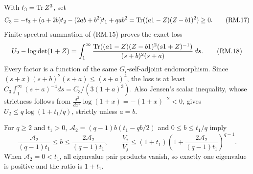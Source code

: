 With $t_3=\operatorname{Tr} Z^3$, set
\begin{equation}
 C_3=-t_3+(a+2b)t_2-(2ab+b^2)t_1+qab^2
 =\operatorname{Tr}((a1-Z)(Z-b1)^2)\ge0.\tag{RM.17}
\end{equation}
Finite spectral summation of (RM.15) proves the exact loss
\begin{equation}
 U_2-\log\det(1+Z)=\int_1^\infty
 \frac{\operatorname{Tr}((a1-Z)(Z-b1)^2(s1+Z)^{-1})}{(s+b)^2(s+a)}\,ds.
 \tag{RM.18}
\end{equation}
Every factor is a function of the same $G_i$-self-adjoint endomorphism.
Since $(s+x)(s+b)^2(s+a)\le(s+a)^4$, the loss is at least
$C_3\int_1^\infty(s+a)^{-4}ds=C_3/(3(1+a)^3)$.
Also Jensen's scalar inequality, whose strictness follows from
$\frac{d^2}{dx^2}\log(1+x)=-(1+x)^{-2}<0$, gives
$U_2\le q\log(1+t_1/q)$, strictly unless $a=b$.

For $q\ge2$ and $t_1>0$,
$\mathcal A_2=(q-1)b(t_1-qb/2)$ and $0\le b\le t_1/q$ imply
\begin{equation}
 \frac{\mathcal A_2}{(q-1)t_1}\le b
 \le\frac{2\mathcal A_2}{(q-1)t_1},\qquad
 \frac{V_i}{V_j}\le(1+t_1)
 \left(1+\frac{2\mathcal A_2}{(q-1)t_1}\right)^{q-1}.\tag{RM.19}
\end{equation}
When $\mathcal A_2=0<t_1$, all eigenvalue pair products vanish, so exactly
one eigenvalue is positive and the ratio is $1+t_1$.


